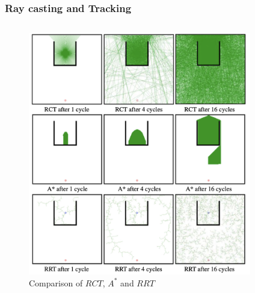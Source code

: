 \documentclass[
    11pt, %
    aspectratio=169, %
]{beamer}
\begin{document}
\begin{frame}
    \frametitle{Ray casting and Tracking}

    \begin{columns}
        \begin{column}{0.5\textwidth}
            \begin{figure}
                \includegraphics[scale=0.3]{assets/rct-conv-comparison.png}
                \caption{Comparison of $RCT$, $A^*$ and $RRT$}
            \end{figure}
        \end{column}
        \begin{column}{0.5\textwidth}
            \begin{figure}

\end{figure}
\end{column}
\end{columns}
\end{frame}
\end{document}
